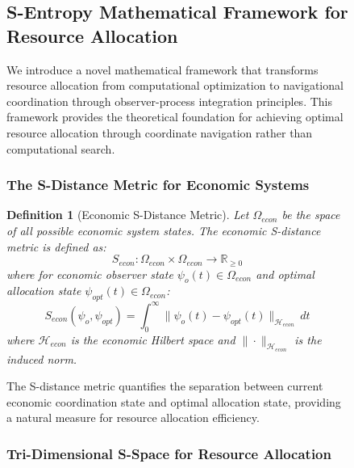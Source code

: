 \documentclass[12pt,a4paper]{article}
\newtheorem{definition}[theorem]{Definition}
\begin{document}
\begin{figure}[H]
\subsection{S-Entropy Mathematical Framework for Resource Allocation}

We introduce a novel mathematical framework that transforms resource allocation from computational optimization to navigational coordination through observer-process integration principles. This framework provides the theoretical foundation for achieving optimal resource allocation through coordinate navigation rather than computational search.

\subsubsection{The S-Distance Metric for Economic Systems}

\begin{definition}[Economic S-Distance Metric]
Let $\Omega_{econ}$ be the space of all possible economic system states. The economic S-distance metric is defined as:
\begin{equation}
S_{econ}: \Omega_{econ} \times \Omega_{econ} \to \mathbb{R}_{\geq 0}
\end{equation}
where for economic observer state $\psi_o(t) \in \Omega_{econ}$ and optimal allocation state $\psi_{opt}(t) \in \Omega_{econ}$:
\begin{equation}
S_{econ}(\psi_o, \psi_{opt}) = \int_0^{\infty} \|\psi_o(t) - \psi_{opt}(t)\|_{\mathcal{H}_{econ}} \, dt
\end{equation}
where $\mathcal{H}_{econ}$ is the economic Hilbert space and $\|\cdot\|_{\mathcal{H}_{econ}}$ is the induced norm.
\end{definition}

The S-distance metric quantifies the separation between current economic coordination state and optimal allocation state, providing a natural measure for resource allocation efficiency.

\subsubsection{Tri-Dimensional S-Space for Resource Allocation}


\end{figure}
\end{document}
